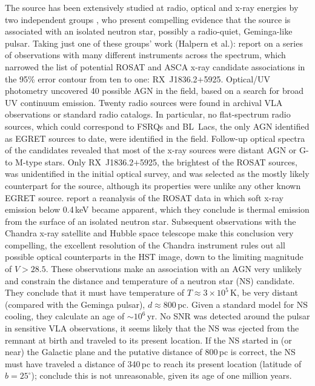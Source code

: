 The source has been extensively studied at radio, optical and x-ray
energies by two independent groups \citep[see][and references
therein]{REF::REIMER::NSPS2002, REF::HALPERN::APJ2002}, who present
compelling evidence that the source is associated with an isolated
neutron star, possibly a radio-quiet, Geminga-like pulsar. Taking just
one of these groups' work (Halpern et al.):
\citet{REF::MIRABAL::APJ2000} report on a series of observations with
many different instruments across the spectrum, which narrowed the
list of potential ROSAT and ASCA x-ray candidate associations in the
95\% error contour from ten to one: RX~J1836.2$+$5925. Optical/UV
photometry uncovered 40 possible AGN in the field, based on a search
for broad UV continuum emission. Twenty radio sources were found in
archival VLA observations or standard radio catalogs. In particular,
no flat-spectrum radio sources, which could correspond to FSRQs and
BL~Lacs, the only AGN identified as EGRET sources to date, were
identified in the field. Follow-up optical spectra of the candidates
revealed that most of the x-ray sources were distant AGN or G- to
M-type stars. Only RX~J1836.2$+$5925, the brightest of the ROSAT
sources, was unidentified in the initial optical survey, and was
selected as the mostly likely counterpart for the
\Gray source, although its properties were unlike any other known
EGRET source. \citet{REF::MIRABAL::APJ2001} report a reanalysis of the
ROSAT data in which soft x-ray emission below 0.4\,keV became
apparent, which they conclude is thermal emission from the surface of
an isolated neutron star. Subsequent observations with the Chandra
x-ray satellite and Hubble space telescope
\citep{REF::HALPERN::APJ2002} make this conclusion very compelling, the
excellent resolution of the Chandra instrument rules out all possible
optical counterparts in the HST image, down to the limiting magnitude
of $V>28.5$.  These observations make an association with an AGN very
unlikely and constrain the distance and temperature of a neutron star
(NS) candidate.  They conclude that it must have temperature of
$T\approx3\times10^5$\,K, be very distant (compared with the Geminga
pulsar), $d\approx800$\,pc. Given a standard model for NS cooling,
they calculate an age of $\sim10^6$\,yr. No SNR was detected around
the pulsar in sensitive VLA observations, it seems likely that the NS
was ejected from the remnant at birth and traveled to its present
location.  If the NS started in (or near) the Galactic plane and the
putative distance of 800\,pc is correct, the NS must have traveled a
distance of 340\,pc to reach its present location (latitude of
$b=25^\circ$); \citet{REF::HALPERN::APJ2002} conclude this is not
unreasonable, given its age of one million years.

